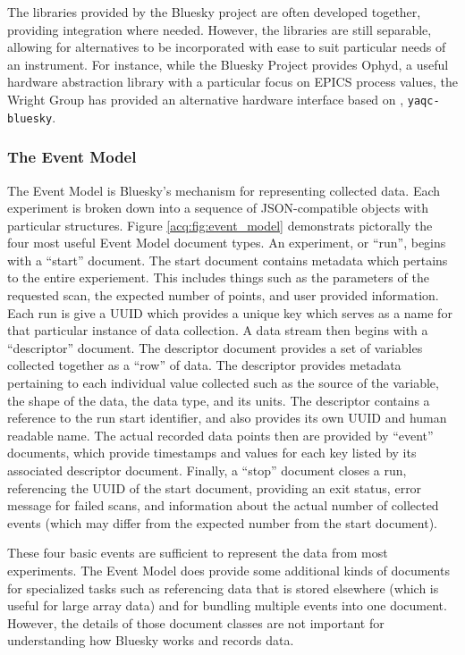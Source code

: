 The libraries provided by the Bluesky project are often developed together, providing integration where needed.
However, the libraries are still separable, allowing for alternatives to be incorporated with ease to suit particular needs of an instrument.
For instance, while the Bluesky Project provides Ophyd\cite{Lauer2020}, a useful hardware abstraction library with a particular focus on EPICS process values, the Wright Group has provided an alternative hardware interface based on \yaq{}, \texttt{yaqc-bluesky}\cite{yaqcbluesky}.

\subsubsection{The Event Model}

The Event Model\cite{eventmodel} is Bluesky's mechanism for representing collected data.
Each experiment is broken down into a sequence of JSON-compatible objects with particular structures.
Figure \ref{acq:fig:event_model} demonstrats pictorally the four most useful Event Model document types.
An experiment, or ``run'', begins with a ``start'' document.
The start document contains metadata which pertains to the entire experiement.
This includes things such as the parameters of the requested scan, the expected number of points, and user provided information.
Each run is give a \Gls{UUID} which provides a unique key which serves as a name for that particular instance of data collection.
A data stream then begins with a ``descriptor'' document.
The descriptor document provides a set of variables collected together as a ``row'' of data.
The descriptor provides metadata pertaining to each individual value collected such as the source of the variable, the shape of the data, the data type, and its units.
The descriptor contains a reference to the run start identifier, and also provides its own \Gls{UUID} and human readable name.
The actual recorded data points then are provided by ``event'' documents, which provide timestamps and values for each key listed by its associated descriptor document.
Finally, a ``stop'' document closes a run, referencing the UUID of the start document, providing an exit status, error message for failed scans, and information about the actual number of collected events (which may differ from the expected number from the start document).

These four basic events are sufficient to represent the data from most experiments.
The Event Model does provide some additional kinds of documents for specialized tasks such as referencing data that is stored elsewhere (which is useful for large array data) and for bundling multiple events into one document.
However, the details of those document classes are not important for understanding how Bluesky works and records data.


